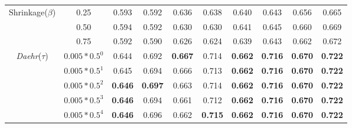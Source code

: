 \documentclass[journal,compsoc]{IEEEtran}
\newcommand{\TheName}{\mbox{\emph{Daehr}}}
\begin{document}
\begin{table}
{\begin{center}
\begin{tabular}{*{10}{c}}
    \multirow{3}{*}{Shrinkage($\beta$)} 
& 0.25 &   0.593& 0.592 &      0.636 & 0.638      & 0.640 & 0.643      & 0.656 & 0.665      \\
& 0.50 &   0.594 & 0.592 &      0.630 & 0.630    & 0.641 & 0.645     & 0.660 & 0.669     \\
& 0.75 &   0.592 & 0.590 &      0.626 & 0.624    & 0.639 & 0.643      & 0.662 & 0.672   \\
\cmidrule(lr){1-2}                        
\cmidrule(lr){3-4}
\cmidrule(lr){5-6}
\cmidrule(lr){7-8}
\cmidrule(lr){9-10}
     \multirow{5}{*}{\TheName($\tau$)} 
     & $0.005*0.5^{0}$ &   0.644 & 0.692 &     \textbf{0.667} & 0.714      & \textbf{0.662} & \textbf{0.716}     & \textbf{0.670} & \textbf{0.722}    \\
     & $0.005*0.5^{1}$ &   0.645 & 0.694 &     0.666 & 0.713      & \textbf{0.662} & \textbf{0.716}    & \textbf{0.670} & \textbf{0.722}    \\     
     & $0.005*0.5^{2}$ &   \textbf{0.646} & \textbf{0.697} &  0.663 & 0.714      & \textbf{0.662} & \textbf{0.716}     & \textbf{0.670} & \textbf{0.722}  \\
     & $0.005*0.5^{3}$ &   \textbf{0.646} & 0.694 &     0.661 & 0.712     & \textbf{0.662} & \textbf{0.716}     & \textbf{0.670} & \textbf{0.722}   \\
     & $0.005*0.5^{4}$ &   \textbf{0.646} & 0.696 &     0.662 & \textbf{0.715}     & \textbf{0.662} & \textbf{0.716}     & \textbf{0.670} & \textbf{0.722}  \\

     \bottomrule

\end{tabular}

\end{center}
}
\end{table}
\end{document}

